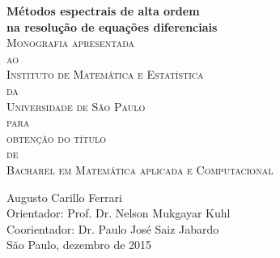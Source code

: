 \documentclass[11pt,twoside,a4paper]{book}
\begin{document}
\frontmatter 
\fancyhead[RO]{{\footnotesize\rightmark}\hspace{2em}\thepage}
\setcounter{tocdepth}{2}
\fancyhead[LE]{\thepage\hspace{2em}\footnotesize{\leftmark}}
\fancyhead[RE,LO]{}
\fancyhead[RO]{{\footnotesize\rightmark}\hspace{2em}\thepage}

\onehalfspacing  %

\thispagestyle{empty}
\begin{center}
    \vspace*{2.3cm}
    \textbf{\Huge{Métodos espectrais de alta ordem \\ \vspace{5mm} na resolução de equações diferenciais}}\\
    

    \vskip 4.0cm
    \LARGE{\textsc{
    Monografia apresentada\\[-0.25cm] 
    ao\\[-0.25cm]
    Instituto de Matemática e Estatística\\[-0.25cm]
    da\\[-0.25cm]
    Universidade de São Paulo\\[-0.25cm]
    para\\[-0.25cm]
    obtenção do título\\[-0.25cm]
    de\\[-0.25cm]
    Bacharel em Matemática aplicada e Computacional}}
    
    \vskip 4.0cm
    \LARGE{Augusto Carillo Ferrari} \\
    \LARGE{    Orientador: Prof.  Dr. Nelson Mukgayar Kuhl\\
    Coorientador: Dr. Paulo José Saiz Jabardo} \\

    \vfill
    \Large{São Paulo, dezembro de 2015}
\end{center}
\end{document}
